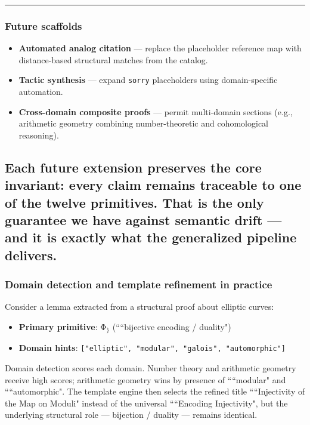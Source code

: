 \documentclass[12pt,a4paper]{article}
\begin{document}
\begin{center}
\rule{0.5\textwidth}{0.4pt}
\end{center}

\subsubsection{Future scaffolds}

\begin{itemize}
    \item \textbf{Automated analog citation} --- replace the placeholder reference map with distance-based structural matches from the catalog.
    \item \textbf{Tactic synthesis} --- expand \texttt{sorry} placeholders using domain-specific automation.
    \item \textbf{Cross-domain composite proofs} --- permit multi-domain sections (e.g., arithmetic geometry combining number-theoretic and cohomological reasoning).
\end{itemize}

\subsection{Each future extension preserves the core invariant: every claim remains traceable to one of the twelve primitives. That is the only guarantee we have against semantic drift --- and it is exactly what the generalized pipeline delivers.}

\subsubsection{Domain detection and template refinement in practice}

Consider a lemma extracted from a structural proof about elliptic curves:

\begin{itemize}
    \item \textbf{Primary primitive}: $\text{Φ}_{\text{\}}}$ (````bijective encoding / duality")
    \item \textbf{Domain hints}: \texttt{{[}"elliptic", "modular", "galois", "automorphic"{]}}
\end{itemize}

Domain detection scores each domain. Number theory and arithmetic geometry receive high scores; arithmetic geometry wins by presence of ````modular" and ````automorphic". The template engine then selects the refined title ````Injectivity of the Map on Moduli" instead of the universal ````Encoding Injectivity", but the underlying structural role --- bijection / duality --- remains identical.
\end{document}
